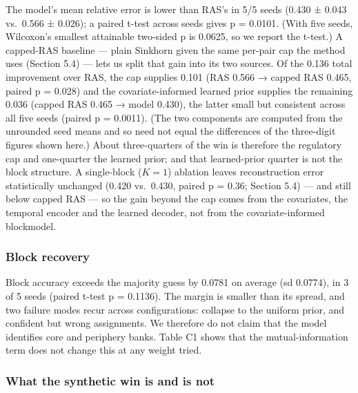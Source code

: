 \documentclass[
  a4paper,
]{article}
\begin{document}
The model's mean relative error is lower than RAS's in 5/5 seeds (0.430
± 0.043 vs.~0.566 ± 0.026); a paired t-test across seeds gives p =
0.0101. (With five seeds, Wilcoxon's smallest attainable two-sided p is
0.0625, so we report the t-test.) A capped-RAS baseline --- plain
Sinkhorn given the same per-pair cap the method uses (Section 5.4) ---
lets us split that gain into its two sources. Of the 0.136 total
improvement over RAS, the cap supplies 0.101 (RAS 0.566 → capped RAS
0.465, paired p = 0.028) and the covariate-informed learned prior
supplies the remaining 0.036 (capped RAS 0.465 → model 0.430), the
latter small but consistent across all five seeds (paired p = 0.0011).
(The two components are computed from the unrounded seed means and so
need not equal the differences of the three-digit figures shown here.)
About three-quarters of the win is therefore the regulatory cap and
one-quarter the learned prior; and that learned-prior quarter is not the
block structure. A single-block (\(K=1\)) ablation leaves reconstruction
error statistically unchanged (0.420 vs.~0.430, paired p = 0.36; Section
5.4) --- and still below capped RAS --- so the gain beyond the cap comes
from the covariates, the temporal encoder and the learned decoder, not
from the covariate-informed blockmodel.

\subsubsection*{Block recovery}\label{block-recovery}

Block accuracy exceeds the majority guess by 0.0781 on average (sd
0.0774), in 3 of 5 seeds (paired t-test p = 0.1136). The margin is
smaller than its spread, and two failure modes recur across
configurations: collapse to the uniform prior, and confident but wrong
assignments. We therefore do not claim that the model identifies core
and periphery banks. Table C1 shows that the mutual-information term
does not change this at any weight tried.

\subsubsection*{What the synthetic win is and is
not}\label{what-the-synthetic-win-is-and-is-not}
\end{document}
